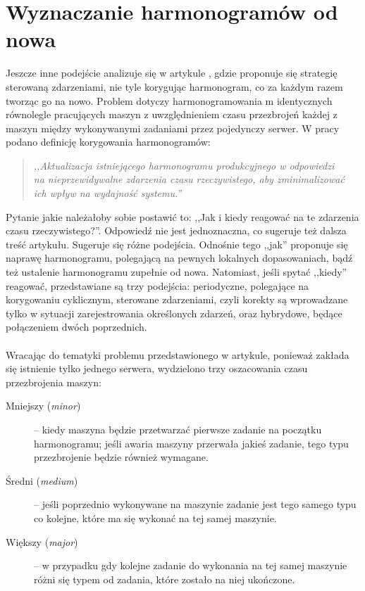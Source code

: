 \documentclass[printmode,oneside]{mgr}
\begin{document}
\section{Wyznaczanie harmonogramów od nowa}
Jeszcze inne podejście analizuje się w artykule \cite{EDSBCR}, gdzie proponuje się strategię sterowaną zdarzeniami, nie tyle korygując harmonogram, co za każdym razem tworząc go na nowo. Problem dotyczy harmonogramowania m identycznych równolegle pracujących maszyn z uwzględnieniem czasu przezbrojeń każdej z maszyn między wykonywanymi zadaniami przez pojedynczy serwer. W pracy podano definicję korygowania harmonogramów:
\begin{quotation}
\emph{,,Aktualizacja istniejącego harmonogramu produkcyjnego w odpowiedzi\\ na nieprzewidywalne zdarzenia czasu rzeczywistego, aby zminimalizować\\ ich wpływ na wydajność systemu.''}
\end{quotation}
Pytanie jakie należałoby sobie postawić to: ,,Jak i kiedy reagować na te zdarzenia czasu rzeczywistego?''. Odpowiedź nie jest jednoznaczna, co sugeruje też dalsza treść artykułu. Sugeruje się różne podejścia. Odnośnie tego ,,jak'' proponuje się naprawę harmonogramu, polegającą na pewnych lokalnych dopasowaniach, bądź też ustalenie harmonogramu zupełnie od nowa. Natomiast, jeśli spytać ,,kiedy'' reagować,  przedstawiane są trzy podejścia: periodyczne, polegające na korygowaniu cyklicznym, sterowane zdarzeniami, czyli korekty są wprowadzane tylko w sytuacji zarejestrowania określonych zdarzeń, oraz hybrydowe, będące połączeniem dwóch poprzednich.\\\\
Wracając do tematyki problemu przedstawionego w artykule, ponieważ zakłada się istnienie tylko jednego serwera, wydzielono trzy oszacowania czasu przezbrojenia maszyn:
\begin{description}
    \item[Mniejszy (\emph{minor})] -- kiedy maszyna będzie przetwarzać pierwsze zadanie na początku harmonogramu; jeśli awaria maszyny przerwała jakieś zadanie, tego typu przezbrojenie będzie również wymagane.
    \item[Średni (\emph{medium})] -- jeśli poprzednio wykonywane na maszynie zadanie jest tego samego typu co kolejne, które ma się wykonać na tej samej maszynie.
    \item[Większy (\emph{major})] -- w przypadku gdy kolejne zadanie do wykonania na tej samej maszynie różni się typem od zadania, które zostało na niej ukończone.
\end{description}
\end{document}
